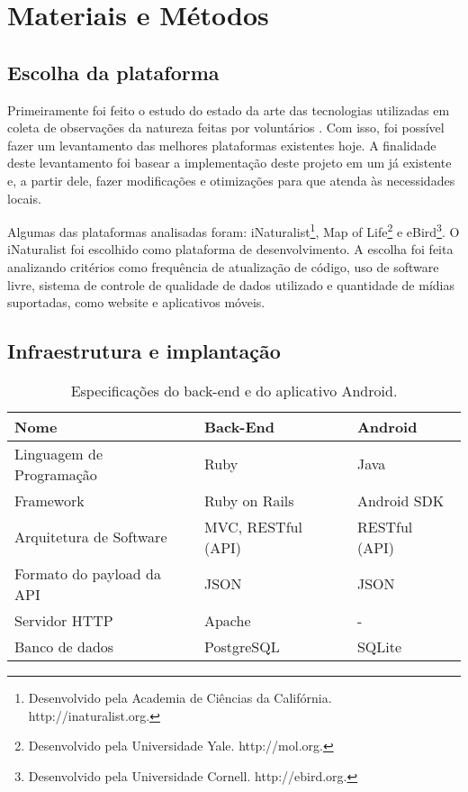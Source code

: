 \section{Materiais e Métodos}
\subsection{Escolha da plataforma}
Primeiramente foi feito o estudo do estado da arte das tecnologias utilizadas em coleta de observações da natureza feitas por voluntários \cite{azavea2014, azavea2015}. Com isso, foi possível fazer um levantamento das melhores plataformas existentes hoje. A finalidade deste levantamento foi basear a implementação deste projeto em um já existente e, a partir dele, fazer modificações e otimizações para que atenda às necessidades locais. 

Algumas das plataformas analisadas foram: iNaturalist\footnote{Desenvolvido pela Academia de Ciências da Califórnia. http://inaturalist.org.}, Map of Life\footnote{Desenvolvido pela Universidade Yale. http://mol.org.} e eBird\footnote{Desenvolvido pela Universidade Cornell. http://ebird.org.}. O iNaturalist foi escolhido como plataforma de desenvolvimento. A escolha foi feita analizando critérios como frequência de atualização de código, uso de software livre, sistema de controle de qualidade de dados utilizado e quantidade de mídias suportadas, como website e aplicativos móveis.

\subsection{Infraestrutura e implantação}

\begin{table}[h!]
  \centering
  \begin{tabular}{lll}
    \toprule
    \textbf{Nome} & \textbf{Back-End} & \textbf{Android} \\
    \midrule
    Linguagem de Programação  & Ruby                & Java \\
    Framework                 & Ruby on Rails       & Android SDK \\
    Arquitetura de Software   & MVC, RESTful (API)  & RESTful (API) \\
    Formato do payload da API & JSON                & JSON \\
    Servidor HTTP             & Apache              & - \\
    Banco de dados            & PostgreSQL          & SQLite \\
    \bottomrule
  \end{tabular}
  
  \caption{Especificações do back-end e do aplicativo Android.}
  \label{tab:back-end-espec}
\end{table}


